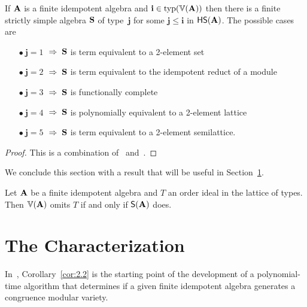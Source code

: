 \documentclass{ws-ijac}
\begin{document}
\begin{proposition}
  \label{prop:2.1}
If $\mathbf{A}$ is a finite idempotent algebra and
$\mathbf{i} \in \operatorname{typ}(\operatorname{\mathbb{V}}(\mathbf{A}))$ then there
is a finite strictly simple algebra $\mathbf{S}$ of
type~$\mathbf{j}$ for
some $\mathbf{j} \leq \mathbf{i}$ in $\mathsf{H} \mathsf{S} (\mathbf{A})$.
The possible cases are
\begin{itemize}
\item[$\bullet\  \mathbf{j} = 1$] $\;\Rightarrow \;\mathbf{S}$ is term equivalent to a 2-element set
\item[$\bullet\   \mathbf{j} = 2$] $\;\Rightarrow \;\mathbf{S}$ is term equivalent to the idempotent reduct of a module
\item[$\bullet\   \mathbf{j} = 3$] $\;\Rightarrow \;\mathbf{S}$ is functionally complete
\item[$\bullet\   \mathbf{j} = 4$] $\;\Rightarrow \;\mathbf{S}$ is polynomially equivalent to a 2-element lattice
\item[$\bullet\   \mathbf{j} = 5$] $\;\Rightarrow \;\mathbf{S}$ is term equivalent to a 2-element semilattice.
\end{itemize} %
\end{proposition}
\begin{proof}
  This is a combination of~\cite[Proposition~3.1]{MR2504025} and~\cite[Theorem~6.1]{MR1191235}.
\end{proof}




We conclude this section with a result that will be useful in Section~\ref{sec:freese-valer-lemm}.
\begin{corollary}
  \label{cor:2.2}
  Let $\mathbf{A}$ be a finite idempotent algebra and $T$ an order ideal in the
  lattice of types. Then $\operatorname{\mathbb{V}}(\mathbf{A})$ omits $T$ if and only if $\mathsf{S}(\mathbf{A})$ does.
\end{corollary}




\section{The Characterization}
\label{sec:freese-valer-lemm}
In~\cite{Freese:2009}, Corollary~\ref{cor:2.2} is the starting point of the
development of a polynomial-time algorithm that determines if a given finite
idempotent algebra generates a congruence modular variety.
\end{document}

